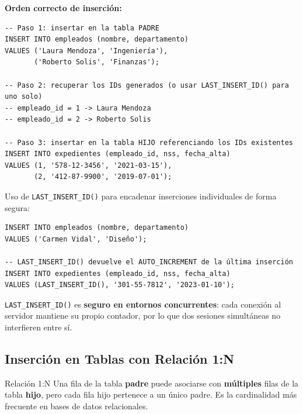 \textbf{Orden correcto de inserción:}

\begin{lstlisting}[style=sql, caption={Inserción respetando integridad referencial 1:1}]
-- Paso 1: insertar en la tabla PADRE
INSERT INTO empleados (nombre, departamento)
VALUES ('Laura Mendoza', 'Ingeniería'),
       ('Roberto Solis', 'Finanzas');

-- Paso 2: recuperar los IDs generados (o usar LAST_INSERT_ID() para uno solo)
-- empleado_id = 1 -> Laura Mendoza
-- empleado_id = 2 -> Roberto Solis

-- Paso 3: insertar en la tabla HIJO referenciando los IDs existentes
INSERT INTO expedientes (empleado_id, nss, fecha_alta)
VALUES (1, '578-12-3456', '2021-03-15'),
       (2, '412-87-9900', '2019-07-01');
\end{lstlisting}

\begin{ejemplo}
  Uso de \texttt{LAST\_INSERT\_ID()} para encadenar inserciones individuales
  de forma segura:

\begin{lstlisting}[style=sql, caption={Encadenamiento con LAST\_INSERT\_ID()}]
INSERT INTO empleados (nombre, departamento)
VALUES ('Carmen Vidal', 'Diseño');

-- LAST_INSERT_ID() devuelve el AUTO_INCREMENT de la última inserción
INSERT INTO expedientes (empleado_id, nss, fecha_alta)
VALUES (LAST_INSERT_ID(), '301-55-7812', '2023-01-10');
\end{lstlisting}
\end{ejemplo}

\begin{nota}
  \texttt{LAST\_INSERT\_ID()} es \textbf{seguro en entornos concurrentes}: cada
  conexión al servidor mantiene su propio contador, por lo que dos sesiones
  simultáneas no interfieren entre sí.
\end{nota}

\subsection{Inserción en Tablas con Relación 1:N}

\begin{definicion}{Relación 1:N}
  Una fila de la tabla \textbf{padre} puede asociarse con \textbf{múltiples}
  filas de la tabla \textbf{hijo}, pero cada fila hijo pertenece a un único
  padre. Es la cardinalidad más frecuente en bases de datos relacionales.
\end{definicion}

